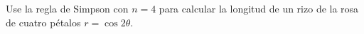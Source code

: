 \item Use la regla de Simpson con $n = 4$ para calcular la longitud de un rizo de la rosa de cuatro pétalos $r = \cos 2\theta$.
